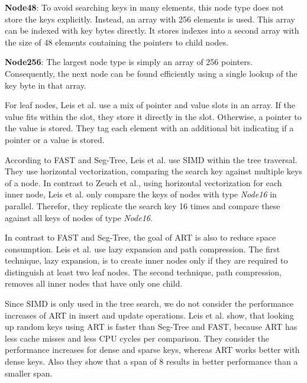 \documentclass[conference]{IEEEtran}
\begin{document}
\textbf{Node48}: To avoid searching keys in many elements, this node type does not store the keys explicitly. Instead, an array with 256 elements is used. This array can be indexed with key bytes directly. It stores indexes into a second array with the size of 48 elements containing the pointers to child nodes.

\textbf{Node256}: The largest node type is simply an array of 256 pointers. Consequently, the next node can be found efficiently using a single lookup of the key byte in that array. 

For leaf nodes, Leis et al. use a mix of pointer and value slots in an array. If the value fits within the slot, they store it directly in the slot. Otherwise, a pointer to the value is stored. They tag each element with an additional bit indicating if a pointer or a value is stored.

According to FAST and Seg-Tree, Leis et al. use SIMD within the tree traversal. They use horizontal vectorization, comparing the search key against multiple keys of a node. In contrast to Zeuch et al., using horizontal vectorization for each inner node, Leis et al. only compare the keys of nodes with type \emph{Node16} in parallel. Therefor, they replicate the search key 16 times and compare these against all keys of nodes of type \emph{Node16}.

In contrast to FAST and Seg-Tree, the goal of ART is also to reduce space consumption. Leis et al. use lazy expansion and path compression. The first technique, lazy expansion, is to create inner nodes only if they are required to distinguish at least two leaf nodes. The second technique, path compression, removes all inner nodes that have only one child.

Since SIMD is only used in the tree search, we do not consider the performance increases of ART in insert and update operations. Leis et al. show, that looking up random keys using ART is faster than Seg-Tree and FAST, because ART has less cache misses and less CPU cycles per comparison. They consider the performance increases for dense and sparse keys, whereas ART works better with dense keys. Also they show that a span of 8 results in better performance than a smaller span. 
\end{document}

